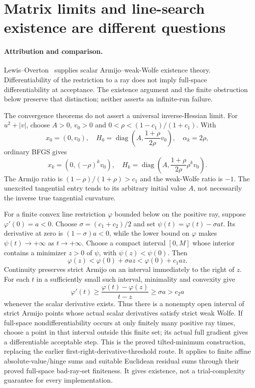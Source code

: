 \section{Matrix limits and line-search existence are different questions}
\paragraph{Attribution and comparison.}
Lewis--Overton~\cite[Theorem~4.5 and Proposition~4.11]{LO} supplies scalar Armijo--weak-Wolfe existence theory. Differentiability of the restriction to a ray does not imply full-space differentiability at acceptance. The existence argument and the finite obstruction below preserve that distinction; neither asserts an infinite-run failure.

The convergence theorems do not assert a universal inverse-Hessian limit. For $u^2+|v|$, choose $A>0$, $v_0>0$ and $0<\rho<(1-c_1)/(1+c_1)$. With
\[
 x_0=(0,v_0),\quad
 H_0=\operatorname{diag}\left(A,\frac{1+\rho}{2\rho}v_0\right),\quad\alpha_k=2\rho,
\]
ordinary BFGS gives
\[
 x_k=(0,(-\rho)^kv_0),\quad
 H_k=\operatorname{diag}\left(A,\frac{1+\rho}{2\rho}\rho^kv_0\right).
\]
The Armijo ratio is $(1-\rho)/(1+\rho)>c_1$ and the weak-Wolfe ratio is $-1$. The unexcited tangential entry tends to its arbitrary initial value $A$, not necessarily the inverse true tangential curvature.

For a finite convex line restriction $\varphi$ bounded below on the positive ray, suppose $\varphi'(0)=a<0$. Choose $\sigma=(c_1+c_2)/2$ and set $\psi(t)=\varphi(t)-\sigma at$. Its derivative at zero is $(1-\sigma)a<0$, while the lower bound on $\varphi$ makes $\psi(t)\to+\infty$ as $t\to+\infty$. Choose a compact interval $[0,M]$ whose interior contains a minimizer $z>0$ of $\psi$, with $\psi(z)<\psi(0)$. Then
\[
 \varphi(z)<\varphi(0)+\sigma az<\varphi(0)+c_1az.
\]
Continuity preserves strict Armijo on an interval immediately to the right of $z$. For each $t$ in a sufficiently small such interval, minimality and convexity give
\[
 \varphi'(t)\ge\frac{\varphi(t)-\varphi(z)}{t-z}\ge\sigma a>c_2a
\]
whenever the scalar derivative exists. Thus there is a nonempty open interval of strict Armijo points whose actual scalar derivatives satisfy strict weak Wolfe. If full-space nondifferentiability occurs at only finitely many positive ray times, choose a point in that interval outside this finite set; its actual full gradient gives a differentiable acceptable step. This is the proved tilted-minimum construction, replacing the earlier first-right-derivative-threshold route. It applies to finite affine absolute-value/hinge sums and suitable Euclidean residual sums through their proved full-space bad-ray-set finiteness. It gives existence, not a trial-complexity guarantee for every implementation.


